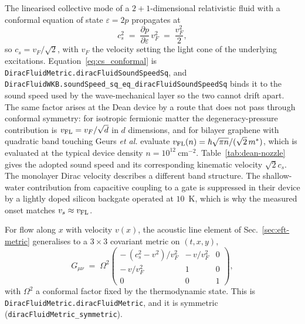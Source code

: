 \documentclass[aps,prd,reprint,nofootinbib,superscriptaddress]{revtex4-2}
\begin{document}
The linearised collective mode of a $2+1$-dimensional relativistic fluid
with a conformal equation of state $\varepsilon = 2p$ propagates at
\begin{equation}
c_s^2 \;=\; \frac{\partial p}{\partial \varepsilon}\, v_F^2 \;=\;
\frac{v_F^2}{2},
\label{eq:cs_conformal}
\end{equation}
so $c_s = v_F/\sqrt{2}$, with $v_F$ the velocity setting the light cone
of the underlying excitations. Equation~\eqref{eq:cs_conformal} is
\texttt{DiracFluidMetric.diracFluidSoundSpeedSq}, and
\texttt{DiracFluidWKB.soundSpeed\_sq\_eq\_diracFluidSoundSpeedSq} binds
it to the sound speed used by the wave-mechanical layer so the two cannot
drift apart. The same factor arises at the Dean device by a route that
does not pass through conformal symmetry: for isotropic fermionic matter
the degeneracy-pressure contribution is $v_{\rm FL} = v_F/\sqrt{d}$ in
$d$ dimensions, and for bilayer graphene with quadratic band touching
Geurs \emph{et al.} evaluate
$v_{\rm FL}(n) = \hbar\sqrt{\pi n}/(\sqrt{2}\,m^{*})$, which is
evaluated at the typical device density
$n = 10^{12}~\mathrm{cm}^{-2}$. Table~\ref{tab:dean-nozzle} gives the
adopted sound speed and its corresponding kinematic velocity
$\sqrt{2}c_s$. The monolayer Dirac velocity describes a different band
structure.
The shallow-water contribution from capacitive coupling to a gate is
suppressed in their device by a lightly doped silicon backgate operated
at $10$~K, which is why the measured onset matches $v_s \approx v_{\rm FL}$.

For flow along $x$ with velocity $v(x)$, the acoustic line element of
Sec.~\ref{sec:eft-metric} generalises to a $3\times 3$ covariant metric
on $(t,x,y)$,
\begin{equation}
G_{\mu\nu} \;=\; \Omega^2
\begin{pmatrix}
-\,(c_s^2 - v^2)/v_F^2 & -\,v/v_F^2 & 0\\[2pt]
-\,v/v_F^2 & 1 & 0\\[2pt]
0 & 0 & 1
\end{pmatrix},
\label{eq:dirac_metric}
\end{equation}
with $\Omega^2$ a conformal factor fixed by the thermodynamic state. This
is \texttt{DiracFluidMetric.diracFluidMetric}, and it is symmetric
(\texttt{diracFluidMetric\_symmetric}).
\end{document}
